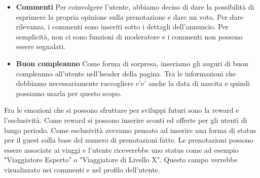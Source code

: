 \documentclass[1_relazione.tex]{subfiles}
\begin{document}
\begin{itemize}
\item \textbf{Commenti} Per coinvolgere l'utente, abbiamo deciso di dare la possibilit\`{a} di esprimere la propria opinione sulla prenotazione e dare un voto. Per dare rilevanza, i commenti sono inseriti sotto i dettagli dell'annuncio. Per semplicit\`{a}, non ci sono funzioni di moderatore e i commenti non possono essere segnalati.

\item \textbf{Buon compleanno} Come forma di sorpresa, inseriamo gli auguri di buon compleanno all'utente nell'header della pagina. Tra le informazioni che dobbiamo necessariamente raccogliere c'e' anche la data di nascita e quindi possiamo usarla per questo scopo.  
\end{itemize}

Fra le emozioni che si possono sfruttare per sviluppi futuri sono la reward e l'esclusivit\`{a}. Come reward si possono inserire sconti ed offerte per gli utenti di lungo periodo. Come esclusivit\`{a} avevamo pensato ad inserire una forma di status per il guest sulla base del numero di prenotazioni fatte. Le prenotazioni possono essere associate ai viaggi e l'utente riceverebbe uno status come ad esempio "Viaggiatore Esperto" o "Viaggiatore di Livello X". Questo campo verrebbe visualizzato nei commenti e nel profilo dell'utente.
\end{document}
